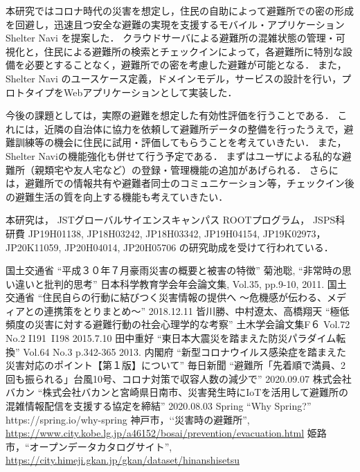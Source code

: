 \documentclass[technicalreport,dvipdfmx]{ieicej}
\begin{document}
本研究ではコロナ時代の災害を想定し，住民の自助によって避難所での密の形成を回避し，迅速且つ安全な避難の実現を支援するモバイル・アプリケーション Shelter Navi を提案した．
クラウドサーバによる避難所の混雑状態の管理・可視化と，住民による避難所の検索とチェックインによって，各避難所に特別な設備を必要とすることなく，避難所での密を考慮した避難が可能となる．
また，Shelter Navi のユースケース定義，ドメインモデル，サービスの設計を行い，プロトタイプをWebアプリケーションとして実装した．

今後の課題としては，実際の避難を想定した有効性評価を行うことである．
これには，近隣の自治体に協力を依頼して避難所データの整備を行ったうえで，避難訓練等の機会に住民に試用・評価してもらうことを考えていきたい．
また，Shelter Naviの機能強化も併せて行う予定である．
まずはユーザによる私的な避難所（親類宅や友人宅など）の登録・管理機能の追加があげられる．
さらには，避難所での情報共有や避難者同士のコミュニケーション等，チェックイン後の避難生活の質を向上する機能も考えていきたい．

\ack %
本研究は，
JSTグローバルサイエンスキャンパス ROOTプログラム，
JSPS科研費 JP19H01138, JP18H03242, JP18H03342, JP19H04154, JP19K02973，JP20K11059, JP20H04014, JP20H05706 の研究助成を受けて行われている．

%
%
\begin{thebibliography}{99}%
 国土交通省 “平成３０年７月豪雨災害の概要と被害の特徴”
 菊池聡, “非常時の思い違いと批判的思考” 日本科学教育学会年会論文集, Vol.35, pp.9-10, 2011.
 国土交通省 “住民自らの行動に結びつく災害情報の提供へ ～危機感が伝わる、メディアとの連携策をとりまとめ～” 2018.12.11
 皆川勝、中村遼太、高橋翔天 “極低頻度の災害に対する避難行動の社会心理学的な考察” 土木学会論文集F６ Vol.72 No.2 I191~I198 2015.7.10
 田中重好 “東日本大震災を踏まえた防災パラダイム転換” Vol.64 No.3 p.342-365 2013.
 内閣府 “新型コロナウイルス感染症を踏まえた災害対応のポイント【第１版】について”
 毎日新聞 “避難所「先着順で満員、2回も振られる」台風10号、コロナ対策で収容人数の減少で” 2020.09.07
 株式会社バカン “株式会社バカンと宮崎県日南市、災害発生時にIoTを活用して避難所の混雑情報配信を支援する協定を締結” 2020.08.03
 Spring “Why Spring?” https://spring.io/why-spring
 神戸市，‘‘災害時の避難所'', 
\url{https://www.city.kobe.lg.jp/a46152/bosai/prevention/evacuation.html}
 姫路市，``オープンデータカタログサイト'',
\url{https://city.himeji.gkan.jp/gkan/dataset/hinanshisetsu}

\end{thebibliography}
\end{document}
